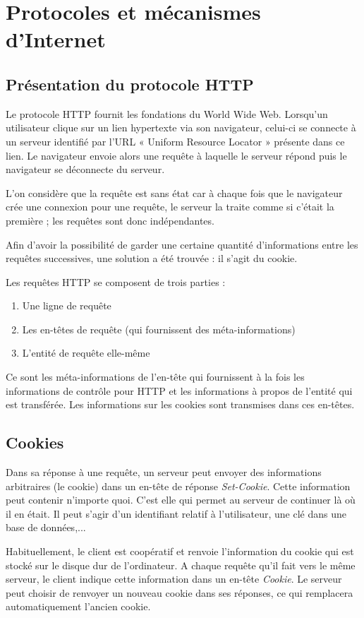 \chapter{Protocoles et mécanismes d'Internet}
\section{Présentation du protocole HTTP}
Le protocole HTTP fournit les fondations du World Wide Web. Lorsqu'un utilisateur clique sur un lien hypertexte via son navigateur, celui-ci se connecte à un serveur identifié par l'URL « Uniform Resource Locator » présente dans ce lien. Le navigateur envoie alors une requête à laquelle le serveur répond puis le navigateur se déconnecte du serveur.

L'on considère que la requête est sans état car à chaque fois que le navigateur crée une connexion pour une requête, le serveur la traite comme si c'était la première ; les requêtes sont donc indépendantes.

Afin d'avoir la possibilité de garder une certaine quantité d'informations entre les requêtes successives, une solution a été trouvée : il s'agit du cookie.

Les requêtes HTTP se composent de trois parties :
\begin{enumerate}
	\item Une ligne de requête
	\item Les en-têtes de requête (qui fournissent des méta-informations)
	\item L'entité de requête elle-même
\end{enumerate}

Ce sont les méta-informations de l'en-tête qui fournissent à la fois les informations de contrôle pour HTTP et les informations à propos de l'entité qui est transférée. Les informations sur les cookies sont transmises dans ces en-têtes.
	
\section{Cookies}
Dans sa réponse à une requête, un serveur peut envoyer des informations arbitraires (le cookie) dans un en-tête de réponse \textit{Set-Cookie}. Cette information peut contenir n'importe quoi. C'est elle qui permet au serveur de continuer là où il en était. Il peut s'agir d'un identifiant relatif à l'utilisateur, une clé dans une base de données,...

Habituellement, le client est coopératif et renvoie l'information du cookie qui est stocké sur le disque dur de l'ordinateur. A chaque requête qu'il fait vers le même serveur, le client indique cette information dans un en-tête \textit{Cookie}. Le serveur peut choisir de renvoyer un nouveau cookie dans ses réponses, ce qui remplacera automatiquement l'ancien cookie.

